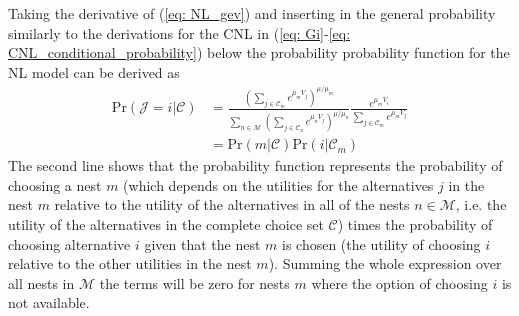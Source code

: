 Taking the  derivative of (\ref{eq: NL_gev}) and inserting in the general probability similarly to the derivations for the CNL in (\ref{eq: Gi}-\ref{eq: CNL_conditional_probability}) below the probability probability function for the NL model \citep{train_discrete_2009} can be derived as
  \begin{equation} \label{eq: NL_probevolutiontwo}
  \begin{split}
   \textrm{Pr}(\mathcal{J}=i|\mathcal{C})
   &= \frac{\left(\sum\limits_{j\in\mathcal{C}_m}e^{\mu_mV_j}
     \right)^{\mu/\mu_m}  }
   {\sum\limits_{n\in\mathcal{M}}
     \left(\sum\limits_{j\in\mathcal{C}_n}e^{\mu_nV_j}
     \right)^{\mu/\mu_n}  }
   \frac{e^{\mu_mV_i}}
     {\sum\limits_{j\in\mathcal{C}_m} e^{\mu_mV_j}} \\
   &= \textrm{Pr}(m|\mathcal{C})\textrm{Pr}(i|\mathcal{C}_m)
  \end{split}
  \end{equation}
The second line shows that the probability function represents the probability of choosing a nest $m$ (which depends on the utilities for the alternatives $j$ in the nest $m$ relative to the utility of the alternatives in all of the nests $n\in\mathcal{M}$, i.e. the utility of the alternatives in the complete choice set $\mathcal{C}$) times the probability of choosing alternative $i$ given that the nest $m$ is chosen (the utility of choosing $i$ relative to the other utilities in the nest $m$). Summing the whole expression over all nests in $\mathcal{M}$ the terms will be zero for nests $m$ where the option of choosing $i$ is not available.


